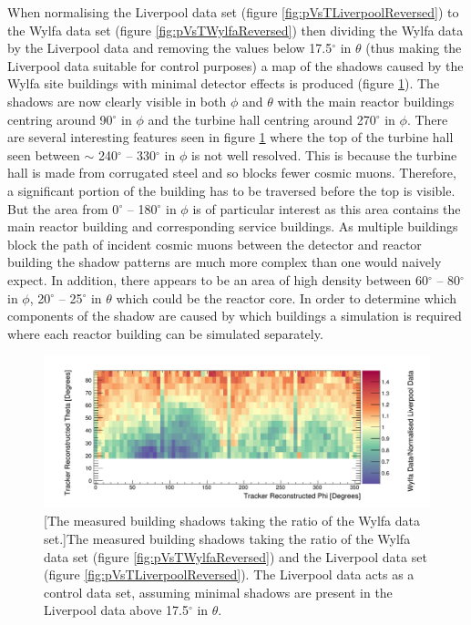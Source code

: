 When normalising the Liverpool data set (figure \ref{fig:pVsTLiverpoolReversed}) to the Wylfa data set (figure \ref{fig:pVsTWylfaReversed}) then dividing the Wylfa data by the Liverpool data and removing the values below 17.5$^\circ$ in $\theta$ (thus making the Liverpool data suitable for control purposes) a map of the shadows caused by the Wylfa site buildings with minimal detector effects is produced (figure \ref{fig:measuredTrackerReconNoLines}). The shadows are now clearly visible in both $\phi$ and $\theta$ with the main reactor buildings centring around 90$^\circ$ in $\phi$ and the turbine hall centring around 270$^\circ$ in $\phi$. There are several interesting features seen in figure \ref{fig:measuredTrackerReconNoLines} where the top of the turbine hall seen between $\sim$ 240$^\circ$ -- 330$^\circ$ in $\phi$ is not well resolved. This is because the turbine hall is made from corrugated steel and so blocks fewer cosmic muons. Therefore, a significant portion of the building has to be traversed before the top is visible. But the area from 0$^\circ$ -- 180$^\circ$ in $\phi$ is of particular interest as this area contains the main reactor building and corresponding service buildings. As multiple buildings block the path of incident cosmic muons between the detector and reactor building the shadow patterns are much more complex than one would naively expect. In addition, there appears to be an area of high density between 60$^\circ$ -- 80$^\circ$ in $\phi$, 20$^\circ$ -- 25$^\circ$ in $\theta$ which could be the reactor core. In order to determine which components of the shadow are caused by which buildings a simulation is required where each reactor building can be simulated separately.

\begin{figure}[!h]
 \centering
 \includegraphics[width=\linewidth]{Chapter5/Figs/wylfaRasterNew/measuredTrackerReconNoLines.png}
 [The measured building shadows taking the ratio of the Wylfa data set.]{The measured building shadows taking the ratio of the Wylfa data set (figure \ref{fig:pVsTWylfaReversed}) and the Liverpool data set (figure \ref{fig:pVsTLiverpoolReversed}). The Liverpool data acts as a control data set, assuming minimal shadows are present in the Liverpool data above 17.5$^\circ$ in $\theta$.} 
 \label{fig:measuredTrackerReconNoLines}
\end{figure}

